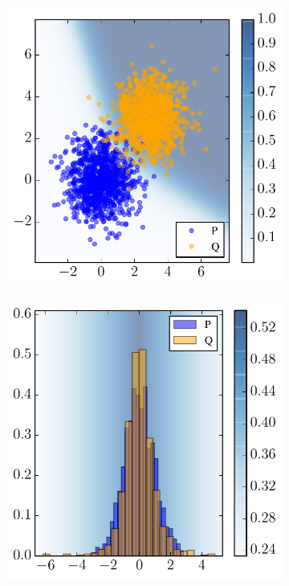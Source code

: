 \documentclass[a4paper]{article}
\begin{document}
  \begin{figure}
    \begin{center}
    \begin{subfigure}{0.26\textwidth}
      \includegraphics[width=\textwidth]{figures/interpret_1.pdf}
    \end{subfigure}
    \hfill
    \begin{subfigure}{0.26\textwidth}
      \includegraphics[width=\textwidth]{figures/interpret_2.pdf}

\end{subfigure}
\end{center}
\end{figure}
\end{document}
